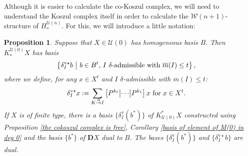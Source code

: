 \documentclass[11pt]{amsart} \renewcommand{\baselinestretch}{1.2}
\theoremstyle{plain}
\newtheorem{prop}[thm]{Proposition}
\theoremstyle{definition}
\newcommand{\calU}{\mathcal{U}}
\newcommand{\calw}{\mathcal{W}}
\newcommand{\deltaalg}{\Delta} %
\newcommand{\minDimP}{\overline{m}}
\newcommand{\produces}[3]{#3:#1\sim #2}
\renewcommand{\produces}[3]{#1\rightarrow_{#3} #2}%
\renewcommand{\produces}[3]{#1\overset{\smash{#3}}{\rightarrow} #2}%
\newcommand{\uver}{^\mathrm{v}}
\newcommand{\deltav}{\delta\uver}
\newcommand{\deltavstar}{\delta^{\mathrm{v}\star}}
\newcommand{\dual}{\mathbf{D}}
\begin{document}
\begin{Koszul complexes}
Although it is easier to calculate the co-Koszul complex, we will need to understand the Koszul complex itself in order to calculate the $\calw(n+1)$-structure of $H_*^{\calU(n)}$. For this, we will introduce a little notation:
\begin{prop}
\label{propDerivedIndTrivialUobject n=0}
Suppose that $X\in\calU(0)$ has homogeneous basis $B$. Then $K_*^{\calU(0)}X$ has basis
\[\left\{\deltavstar_Ib\ \middle|\ b\in B^t\textup{, $I$ $\delta$-admissible with }\minDimP(I)\leq t\right\},\]
where we define, for any $x \in X^t$ and $I$ $\delta$-admissible with $\minDimP(I)\leq t$:
\[\deltavstar_Ix:=
\sum_{\produces{K}{I}{\deltaalg}}\left[P^{k_\ell} \middle|\cdots\middle|P^{k_1} \right]x\textup{ for $x\in X^t$}.\]
%
If $X$ is of finite type, there is a basis $\{\deltav_I(b^*)\}$ of $K^*_{\calU(0)}X$ constructed using Proposition \ref{the cokoszul complex is free}, Corollary \ref{basis of element of M(0) in deg 0} and the basis $\{b^*\}$ of $\dual X$ dual to $B$. The bases $\{\deltav_I(b^*)\}$ and $\{\deltavstar_Ib\}$ are dual.


\end{prop}
\end{Koszul complexes}
\end{document}
